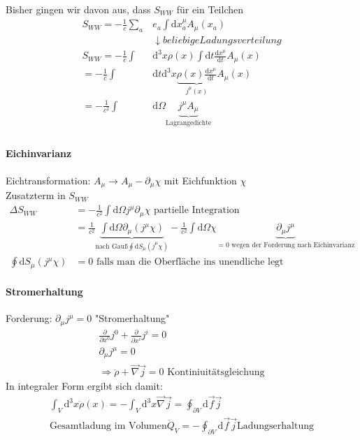 \documentclass[a4paper]{article}
\begin{document}
Bisher gingen wir davon aus, dass $S_{WW}$ für ein Teilchen
\begin{align}
S_{WW}=-\frac{1}{c}\sum_a&e_a\int \mathrm{d}x_a^\mu A_\mu(x_a)\\
&\downarrow beliebige Ladungsverteilung\\
S_{WW}=-\frac{1}{c}\int&\mathrm{d}^3x\rho(x)\int \mathrm{d}t\frac{\mathrm{d}x^\mu}{\mathrm{d}t}A_\mu(x)\\
=-\frac{1}{c}\int&\mathrm{d}t\mathrm{d}^3x\underbrace{\rho(x)\frac{\mathrm{d}x^\mu}{\mathrm{d}t}}_{j^\mu(x)}A_\mu(x)\\
=-\frac{1}{c^2}\int&\mathrm{d}\Omega \underbrace{j^\mu A_\mu}_{\text{Lagrangedichte}}\\
\end{align}
\paragraph{Eichinvarianz}
Eichtransformation: $A_\mu\rightarrow A_\mu-\partial_\mu\chi$ mit Eichfunktion
$\chi$\\
Zusatzterm in $S_{WW}$\\
\begin{align}
\Delta S_{WW}&=-\frac{1}{c^2}\int \mathrm{d}\Omega j^\mu \partial_\mu\chi
\text{   partielle Integration}\\
&=\frac{1}{c^2}\underbrace{\int \mathrm{d}\Omega \partial_\mu(j^\mu\chi)}_{\text{nach
Gauß} \oint \mathrm{d}S_\mu(j^\mu\chi)}-\frac{1}{c^2}\int \mathrm{d}\Omega
\chi\underbrace{\partial_\mu j^\mu}_{=0 \text{ wegen der Forderung nach
Eichinvarianz}}\\
\oint \mathrm{d}S_\mu(j^\mu\chi)&=0 \text{ falls man die Oberfläche ins unendliche legt}
\end{align}
\paragraph{Stromerhaltung}
Forderung: $\partial_\mu j^\mu=0$ "Stromerhaltung"
\begin{align}
\frac{\partial}{\partial x^0}j^0+\frac{\partial}{\partial x^i}j^i=0 \\
\partial_\mu j^\mu=0\\
\Rightarrow \ddot{\rho}+\vec{\nabla}\vec{j}=0 \text{  Kontiniuitätsgleichung}
\end{align}
In integraler Form ergibt sich damit:
\begin{align}
\int_V \mathrm{d}^3x\ddot{\rho}(x)=-\int_V \mathrm{d}^3x \vec{\nabla}\vec{j} = \oint_{\partial
V}\mathrm{d}\vec{f}\vec{j}\\
\text{Gesamtladung im Volumen} \ddot{Q}_V=-\oint_{\partial V}\mathrm{d}\vec{f}\vec{j}
\text{Ladungserhaltung}
\end{align}
\end{document}

